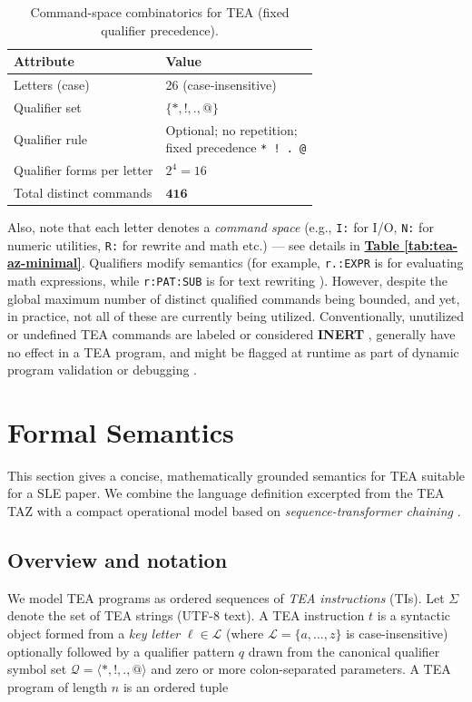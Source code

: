 \documentclass[sigplan,screen]{acmart}
\begin{document}
\begin{table}[ht]
  \centering
  \caption{Command-space combinatorics for TEA (fixed qualifier precedence).}
  \label{tab:tea-command-space}
  \begin{tabular}{@{}ll@{}}
    \hline
    \textbf{Attribute} & \textbf{Value} \\
    \hline
    Letters (case) & 26 (case‑insensitive) \\
    Qualifier set & \(\{*,!,.,@\}\) \\
    Qualifier rule & \makecell[l]{Optional; no repetition;\\fixed precedence \texttt{* ! . @}} \\
    Qualifier forms per letter & \(2^{4}=16\) \\
    Total distinct commands & \(\mathbf{416}\) \\
    \hline
  \end{tabular}
\end{table}


Also, note that each letter denotes a \emph{command space} (e.g., \texttt{I:} for I/O, \texttt{N:} for numeric utilities, \texttt{R:} for rewrite and math etc.) --- see details in \textbf{\hyperref[tab:tea-az-minimal]{Table \ref{tab:tea-az-minimal}}}. Qualifiers modify semantics (for example, \texttt{r.:EXPR} is for evaluating math expressions, while \texttt{r:PAT:SUB} is for text rewriting \cite{Lutalo2024TEATAZ}). However, despite the global maximum number of distinct qualified commands being bounded, and yet, in practice, not all of these are currently being utilized. Conventionally, unutilized or undefined TEA commands are labeled or considered \textbf{INERT} \cite{Lutalo2024TEATAZ}, generally have no effect in a TEA program, and might be flagged at runtime as part of dynamic program validation or debugging \cite{Lutalo2025debug}.

\section{Formal Semantics}
\label{sec:formal-semantics}

This section gives a concise, mathematically grounded semantics for TEA suitable for a SLE paper.  We combine the language definition excerpted from the TEA TAZ \cite{Lutalo2024TEATAZ} with a compact operational model based on \emph{sequence-transformer chaining} \cite{Lutalo2025_transformatics_thesis}. 

\subsection{Overview and notation}
We model TEA programs as ordered sequences of \emph{TEA instructions} (TIs).  Let \(\Sigma\) denote the set of TEA strings (UTF-8 text).  A TEA instruction \(t\) is a syntactic object formed from a \emph{key letter} \( \ell \in \mathcal{L} \) (where \(\mathcal{L}=\{a,\dots,z\}\) is case-insensitive) optionally followed by a qualifier pattern \(q\) drawn from the canonical qualifier symbol set \(\mathcal{Q} = \langle *,!,.,@\rangle\) and zero or more colon-separated parameters.  A TEA program of length \(n\) is an ordered tuple
\end{document}
